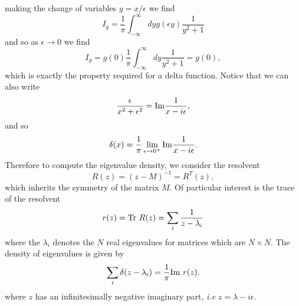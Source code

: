 \documentclass[11pt]{report}
\begin{document}
making the change of variables $y= x/\epsilon$ we find
\begin{equation}
I_g =\frac{1}{\pi} \int_{-\infty}^{\infty} dy g(\epsilon y) \frac{1}{y^2 + 1} 
\end{equation}
and so as $\epsilon\to 0$ we find
\begin{equation}
I_g = g(0) \frac{1}{\pi}\int_{-\infty}^{\infty} dy  \frac{1}{y^2 + 1} = g(0),
\end{equation}
which is exactly the property required for a delta function. Notice that we can also write
\begin{equation}
\frac{\epsilon}{x^2 + \epsilon^2} ={\rm Im} \frac{1}{x-i\epsilon},
\end{equation}
and so
\begin{equation}
\delta(x) = \frac{1}{\pi}\lim_{\epsilon \to 0^+} {\rm Im}\frac{1}{x-i\epsilon}.
\end{equation} 
Therefore to compute the eigenvalue density, we consider the resolvent
\begin{equation}
R(z) = (z-M)^{-1} = R^T(z),
\end{equation}
which inherits the symmetry of the matrix $M$. Of particular interest is the trace of the resolvent
\begin{equation}
r(z) = {\rm Tr} \ R(z) = \sum_{i} \frac{1}{z-\lambda_i}
\end{equation}
where the $\lambda_i$ denotes the $N$ real eigenvalues for matrices which are $N\times N$.
The density of eigenvalues is given by
\begin{equation}
 \sum_i \delta(z-\lambda_i) =\frac{1}{\pi}{\rm Im} \ r(z)   .
\end{equation}
where $z$ has an infinitesimally negative imaginary part, {\em i.e} $z=\lambda-i\epsilon$.
\end{document}

